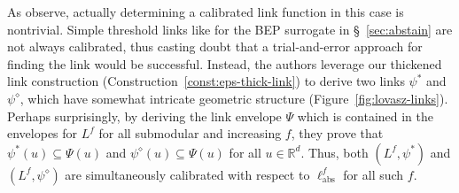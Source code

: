 \documentclass[11pt]{article}
\newcommand{\reals}{\mathbb{R}}
\newcommand{\ellabs}{\ell_{\text{abs}}^f}
\begin{document}
As \citeauthor{ourlovaszpaper} observe, actually determining a calibrated link function in this case is nontrivial.
Simple threshold links like for the BEP surrogate in \S~\ref{sec:abstain} are not always calibrated, thus casting doubt that a trial-and-error approach for finding the link would be successful.
Instead, the authors leverage our thickened link construction (Construction~\ref{const:eps-thick-link}) to derive two links $\psi^*$ and $\psi^\diamond$, which have somewhat intricate geometric structure (Figure~\ref{fig:lovasz-links}).
Perhaps surprisingly, by deriving the link envelope $\Psi$ which is contained in the envelopes for $L^f$ for all submodular and increasing $f$, they prove that $\psi^*(u) \subseteq \Psi(u)$ and $\psi^\diamond(u) \subseteq \Psi(u)$ for all $u \in \reals^d$.
Thus, both $(L^f, \psi^*)$ and $(L^f, \psi^\diamond)$ are simultaneously calibrated with respect to $\ellabs$ for all such $f$.
\end{document}
